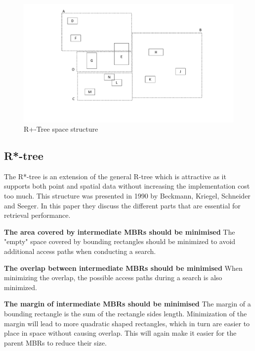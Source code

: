 \begin{figure}[ht]
    \centering
    \includegraphics[scale=0.3]{figures/RPlusTree_space.pdf}
    \caption{R+-Tree space structure}
    \label{fig:RplusTreeSpace}
\end{figure}

\subsection{R*-tree}
The R*-tree is an extension of the general R-tree which is attractive as it supports both point and spatial data without increasing the implementation cost too much. This structure was presented in 1990 by Beckmann, Kriegel, Schneider and Seeger\cite{R*-tree}. In this paper they discuss the different parts that are essential for retrieval performance.\newline

\noindent
\textbf{The area covered by intermediate MBRs should be minimised}\newline
The "empty" space covered by bounding rectangles should be minimized to avoid additional access paths when conducting a search. \newline

\noindent
\textbf{The overlap between intermediate MBRs should be minimised}\newline
When minimizing the overlap, the possible access paths during a search is also minimized. \newline

\noindent
\textbf{The margin of intermediate MBRs should be minimised}\newline
The margin of a bounding rectangle is the sum of the rectangle sides length. Minimization of the margin will lead to more quadratic shaped rectangles, which in turn are easier to place in space without causing overlap. This will again make it easier for the parent MBRs to reduce their size. \newline

